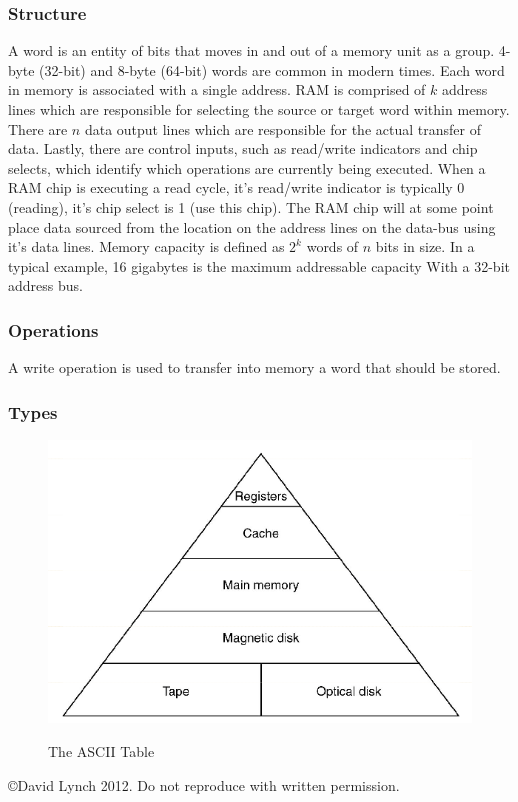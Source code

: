\documentclass[10pt,a4paper]{article}
\begin{document}
\subsubsection{Structure}
A word is an entity of bits that moves in and out of a memory unit as a group. 4-byte (32-bit) and 8-byte (64-bit) words are common in modern times. Each word in memory is associated with a single address. RAM is comprised of $k$ address lines which are responsible for selecting the source or target word within memory. There are $n$ data output lines which are responsible for the actual transfer of data. Lastly, there are control inputs, such as read/write indicators and chip selects, which identify which operations are currently being executed. When a RAM chip is executing a read cycle, it's read/write indicator is typically 0 (reading), it's chip select is 1 (use this chip). The RAM chip will at some point place data sourced from the location on the address lines on the data-bus using it's data lines. 
\newline\newline
Memory capacity is defined as $2^{k}$ words of $n$ bits in size. In a typical example, 16 gigabytes is the maximum addressable capacity With a 32-bit address bus. 
\subsubsection{Operations}
A write operation is used to transfer into memory a word that should be stored. 

\subsubsection{Types}
\begin{figure}
\caption{The ASCII Table\cite{LOGICDESIGN}}
\begin{center}
\includegraphics[scale=0.60]{../images/memory-h.png}
\label{mem-h}
\end{center}
\end{figure}
{}

\begin{center}
{\small \copyright  David Lynch 2012. Do not reproduce with written permission.}
\end{center}
\end{document}
